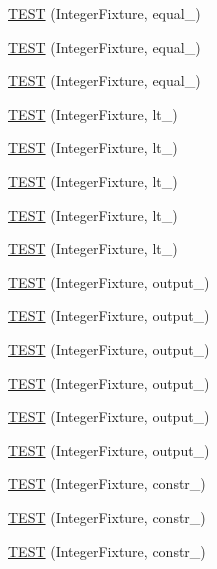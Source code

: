 \begin{DoxyCompactItemize}
\item 
\hyperlink{TestInteger_8c_09_09_a70517ceddadbd138f71b7dcee90dddba}{T\-E\-S\-T} (Integer\-Fixture, equal\-\_)
\item 
\hyperlink{TestInteger_8c_09_09_a05770307c102916f66ecbe5711f3a6cb}{T\-E\-S\-T} (Integer\-Fixture, equal\-\_)
\item 
\hyperlink{TestInteger_8c_09_09_ae14c13841889110a05c40bbcb649c005}{T\-E\-S\-T} (Integer\-Fixture, equal\-\_)
\item 
\hyperlink{TestInteger_8c_09_09_a97a0e4b149d6336dde4708d7f904b42b}{T\-E\-S\-T} (Integer\-Fixture, lt\-\_)
\item 
\hyperlink{TestInteger_8c_09_09_a1951cfe759c7e9e571cce1ab03405d25}{T\-E\-S\-T} (Integer\-Fixture, lt\-\_)
\item 
\hyperlink{TestInteger_8c_09_09_a65c244bbd48ca66d692ba8b5f62edba8}{T\-E\-S\-T} (Integer\-Fixture, lt\-\_)
\item 
\hyperlink{TestInteger_8c_09_09_a8d234c9c5755af37f23c8446385e7671}{T\-E\-S\-T} (Integer\-Fixture, lt\-\_)
\item 
\hyperlink{TestInteger_8c_09_09_a5e841294c02dc27d2190205a2386b70c}{T\-E\-S\-T} (Integer\-Fixture, lt\-\_)
\item 
\hyperlink{TestInteger_8c_09_09_ad08b9f071ac9c9d8011036402a3137a5}{T\-E\-S\-T} (Integer\-Fixture, output\-\_)
\item 
\hyperlink{TestInteger_8c_09_09_a49945df80ba649be1122c0ef148edcb8}{T\-E\-S\-T} (Integer\-Fixture, output\-\_)
\item 
\hyperlink{TestInteger_8c_09_09_a1f08b7b6c024f8572a50b6a86397d280}{T\-E\-S\-T} (Integer\-Fixture, output\-\_)
\item 
\hyperlink{TestInteger_8c_09_09_add10fb3a265027aa08abfb7008f51491}{T\-E\-S\-T} (Integer\-Fixture, output\-\_)
\item 
\hyperlink{TestInteger_8c_09_09_a2f36ceb3def938b6eeb5f31f3821e6ec}{T\-E\-S\-T} (Integer\-Fixture, output\-\_)
\item 
\hyperlink{TestInteger_8c_09_09_a47bcb95f876f330ef8fecf39bfea44db}{T\-E\-S\-T} (Integer\-Fixture, output\-\_)
\item 
\hyperlink{TestInteger_8c_09_09_a70e6099d30cda377ccd29d932d0a4eb4}{T\-E\-S\-T} (Integer\-Fixture, constr\-\_)
\item 
\hyperlink{TestInteger_8c_09_09_a10959f16f90ef2c23b902914a45bc8b8}{T\-E\-S\-T} (Integer\-Fixture, constr\-\_)
\item 
\hyperlink{TestInteger_8c_09_09_ac2be55c72d93eea718cbbc93c6cd630b}{T\-E\-S\-T} (Integer\-Fixture, constr\-\_)

\end{DoxyCompactItemize}
